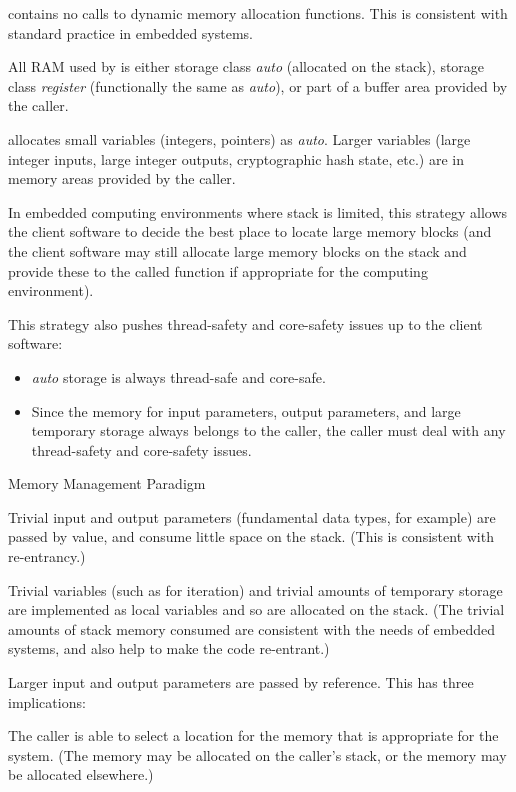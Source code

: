 \emph{\productbasenameshort{}} contains no calls to dynamic 
memory allocation functions.  This is consistent with 
standard practice in embedded systems.  

All RAM used by \emph{\productbasenameshort{}} is either 
storage class \emph{auto} (allocated on the stack), storage 
class \emph{register} (functionally the same as 
\emph{auto}), or part of a buffer area provided by the 
caller.  

\emph{\productbasenameshort{}} allocates small variables 
(integers, pointers) as \emph{auto}\@.  Larger variables 
(large integer inputs, large integer outputs, cryptographic 
hash state, etc.) are in memory areas provided by the 
caller.  

In embedded computing environments where stack is limited, 
this strategy allows the client software to decide the best 
place to locate large memory blocks (and the client software 
may still allocate large memory blocks on the stack and 
provide these to the called \emph{\productbasenameshort{}} 
function if appropriate for the computing environment).  

This strategy also pushes thread-safety and core-safety 
issues up to the client software: 

\begin{itemize}
\item \emph{auto} storage is always thread-safe and
      core-safe.
\item Since the memory for input parameters, output
      parameters, and large temporary storage always
      belongs to the caller, the caller must deal
      with any thread-safety and core-safety issues.
\end{itemize}

Memory Management Paradigm

Trivial input and output parameters (fundamental data types, for example)
are passed by value, and consume little space on the stack. (This is
consistent with re-entrancy.)

Trivial variables (such as for iteration) and trivial amounts of
temporary storage are implemented as local variables and so are allocated
on the stack. (The trivial amounts of stack memory consumed are consistent
with the needs of embedded systems, and also help to make the code re-entrant.)

Larger input and output parameters are passed by reference. This has three
implications:

The caller is able to select a location for the memory that is appropriate
for the system. (The memory may be allocated on the caller's stack, or the
memory may be allocated elsewhere.)

